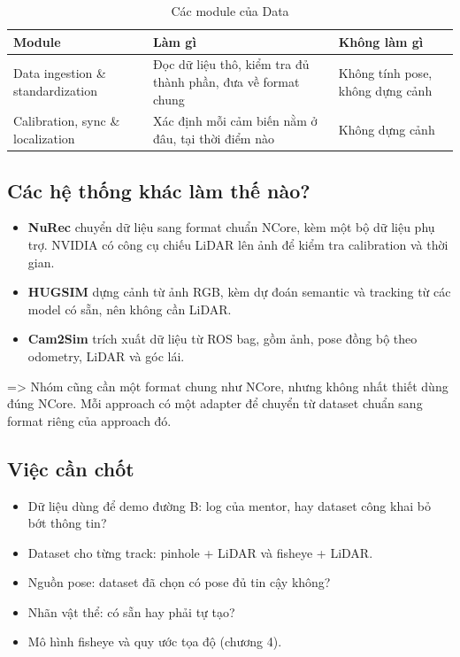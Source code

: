 \begin{table}[H]
  \centering
  \small
  \caption{Các module của Data}
  \begin{tabularx}{\linewidth}{>{\raggedright\arraybackslash}p{3.6cm} >{\raggedright\arraybackslash}X >{\raggedright\arraybackslash}X}
    \toprule
    \textbf{Module} & \textbf{Làm gì} & \textbf{Không làm gì} \\
    \midrule
    Data ingestion \& standardization & Đọc dữ liệu thô, kiểm tra đủ thành phần, đưa về format chung & Không tính pose, không dựng cảnh \\
    \addlinespace
    Calibration, sync \& localization & Xác định mỗi cảm biến nằm ở đâu, tại thời điểm nào & Không dựng cảnh \\
    \bottomrule
  \end{tabularx}
\end{table}

\subsection{Các hệ thống khác làm thế nào?}

\begin{itemize}
  \item \textbf{NuRec} chuyển dữ liệu sang format chuẩn NCore, kèm một bộ dữ liệu phụ trợ. NVIDIA có công cụ chiếu LiDAR lên ảnh để kiểm tra calibration và thời gian.
  \item \textbf{HUGSIM} dựng cảnh từ ảnh RGB, kèm dự đoán semantic và tracking từ các model có sẵn, nên không cần LiDAR.
  \item \textbf{Cam2Sim} trích xuất dữ liệu từ ROS bag, gồm ảnh, pose đồng bộ theo odometry, LiDAR và góc lái.
\end{itemize}

=> Nhóm cũng cần một format chung như NCore, nhưng không nhất thiết dùng đúng NCore. Mỗi approach có một adapter để chuyển từ dataset chuẩn sang format riêng của approach đó.

\subsection{Việc cần chốt}

\begin{itemize}
  \item Dữ liệu dùng để demo đường B: log của mentor, hay dataset công khai bỏ bớt thông tin?
  \item Dataset cho từng track: pinhole + LiDAR và fisheye + LiDAR.
  \item Nguồn pose: dataset đã chọn có pose đủ tin cậy không?
  \item Nhãn vật thể: có sẵn hay phải tự tạo?
  \item Mô hình fisheye và quy ước tọa độ (chương 4).
\end{itemize}

